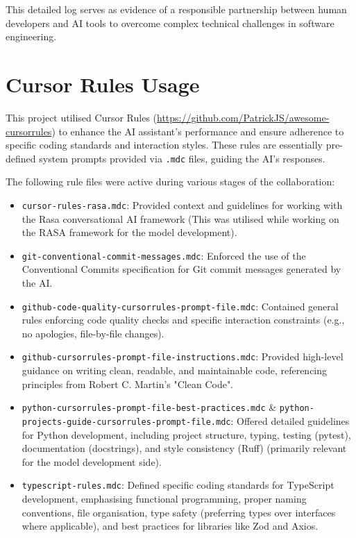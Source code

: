 \documentclass[11pt]{article} %
\begin{document}
This detailed log serves as evidence of a responsible partnership between human developers and AI tools to overcome complex technical challenges in software engineering.

\section*{Cursor Rules Usage}
This project utilised Cursor Rules (\url{https://github.com/PatrickJS/awesome-cursorrules}) to enhance the AI assistant's performance and ensure adherence to specific coding standards and interaction styles. These rules are essentially pre-defined system prompts provided via \texttt{.mdc} files, guiding the AI's responses.

The following rule files were active during various stages of the collaboration:
\begin{itemize}
    \item \texttt{cursor-rules-rasa.mdc}: Provided context and guidelines for working with the Rasa conversational AI framework (This was utilised while working on the RASA framework for the model development).
    \item \texttt{git-conventional-commit-messages.mdc}: Enforced the use of the Conventional Commits specification for Git commit messages generated by the AI.
    \item \texttt{github-code-quality-cursorrules-prompt-file.mdc}: Contained general rules enforcing code quality checks and specific interaction constraints (e.g., no apologies, file-by-file changes).
    \item \texttt{github-cursorrules-prompt-file-instructions.mdc}: Provided high-level guidance on writing clean, readable, and maintainable code, referencing principles from Robert C. Martin's "Clean Code".
    \item \texttt{python-cursorrules-prompt-file-best-practices.mdc} \& \texttt{python-projects-guide-cursorrules-prompt-file.mdc}: Offered detailed guidelines for Python development, including project structure, typing, testing (pytest), documentation (docstrings), and style consistency (Ruff) (primarily relevant for the model development side).
    \item \texttt{typescript-rules.mdc}: Defined specific coding standards for TypeScript development, emphasising functional programming, proper naming conventions, file organisation, type safety (preferring types over interfaces where applicable), and best practices for libraries like Zod and Axios.
\end{itemize}
\end{document}
